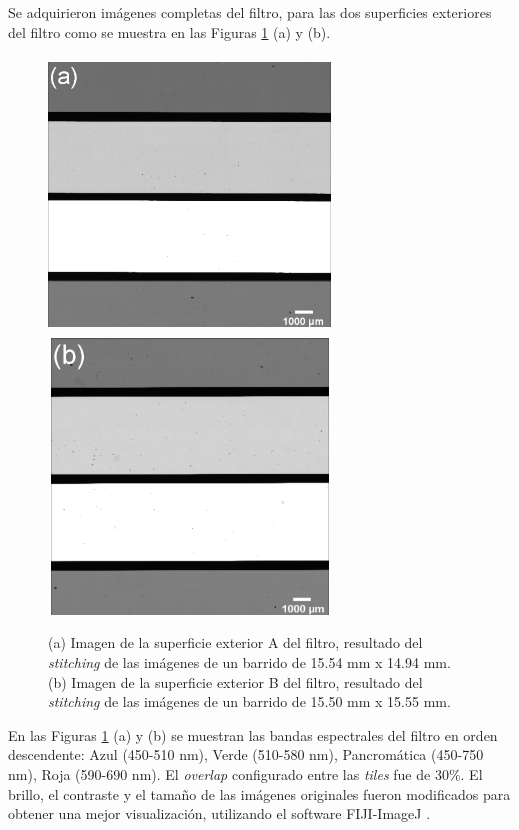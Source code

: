 \hspace{0.5cm}Se adquirieron imágenes completas del filtro, para las dos superficies exteriores del filtro como se muestra en las Figuras \ref{fig:supsfiltro} (a) y (b).
\begin{figure}[H]
\centering
\includegraphics[width=7.5cm,height=7.33cm]{Figs/cuantificaciondefectos/supextex2216.png}
\hfill
\includegraphics[width=7.5cm,height=7.33cm]{Figs/cuantificaciondefectos/supextex1515.png}
\caption{(a) Imagen de la superficie exterior A del filtro, resultado del \textit{stitching} de las imágenes de un barrido de 15.54 mm x 14.94 mm. (b) Imagen de la superficie exterior B del filtro, resultado del \textit{stitching} de las imágenes de un barrido de 15.50 mm x 15.55 mm.}
\label{fig:supsfiltro}
\end{figure}
 En las Figuras \ref{fig:supsfiltro} (a) y (b) se muestran las bandas espectrales del filtro en orden descendente: Azul (450-510 nm), Verde (510-580 nm), Pancromática (450-750 nm), Roja (590-690 nm). El \textit{overlap} configurado entre las \textit{tiles} fue de 30\%. El brillo, el contraste y el tamaño de las imágenes originales fueron modificados para obtener una mejor visualización, utilizando el software FIJI-ImageJ \cite{fiji}. 

